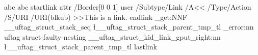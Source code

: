 \documentclass{article}
\begin{document}
\leavevmode
{}
abc
\tagmcend
{}
abc
\tagmcend
{}
\pdfextension startlink
    attr {/Border[0 0 1]}
    user{
        /Subtype/Link%
        /A<<%
         /Type/Action%
         /S/URI%
         /URI(blkub)%
         >>}This is a link.
\pdfextension endlink
\ExplSyntaxOn
\seq_get:NNF
    \g__uftag_struct_stack_seq
    \l__uftag_struct_stack_parent_tmp_tl
    {
     \msg_error:nn { uftag } { struct-faulty-nesting }
    }
\__uftag_struct_kid_link_gput_right:nn { \l__uftag_struct_stack_parent_tmp_tl } {\pdffeedback lastlink}
\ExplSyntaxOff
\tagmcend
\tagstructend
\tagstructend
\tagstructend
\end{document}
